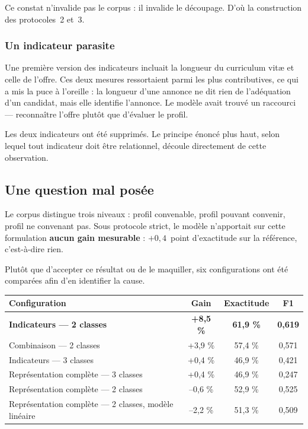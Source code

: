 \documentclass[11pt,a4paper]{article}
\begin{document}
Ce constat n'invalide pas le corpus : il invalide le découpage. D'où la construction des protocoles~2 et~3.

\subsubsection{Un indicateur parasite}
Une première version des indicateurs incluait la longueur du curriculum vitæ et celle de l'offre. Ces deux mesures ressortaient parmi les plus contributives, ce qui a mis la puce à l'oreille : la longueur d'une annonce ne dit rien de l'adéquation d'un candidat, mais elle identifie l'annonce. Le modèle avait trouvé un raccourci — reconnaître l'offre plutôt que d'évaluer le profil.

Les deux indicateurs ont été supprimés. Le principe énoncé plus haut, selon lequel tout indicateur doit être relationnel, découle directement de cette observation.

\subsection{Une question mal posée}
Le corpus distingue trois niveaux : profil convenable, profil pouvant convenir, profil ne convenant pas. Sous protocole strict, le modèle n'apportait sur cette formulation \textbf{aucun gain mesurable} : $+0{,}4$~point d'exactitude sur la référence, c'est-à-dire rien.

Plutôt que d'accepter ce résultat ou de le maquiller, six configurations ont été comparées afin d'en identifier la cause.

\begin{center}
\small
\begin{tabular}{lccc}
  \toprule
  \textbf{Configuration} & \textbf{Gain} & \textbf{Exactitude} & \textbf{F1} \\
  \midrule
  \textbf{Indicateurs --- 2 classes} & \textcolor{vert}{\textbf{+8,5 \%}} & \textbf{61,9 \%} & \textbf{0,619} \\
  Combinaison --- 2 classes & +3,9 \% & 57,4 \% & 0,571 \\
  Indicateurs --- 3 classes & +0,4 \% & 46,9 \% & 0,421 \\
  Représentation complète --- 3 classes & +0,4 \% & 46,9 \% & 0,247 \\
  Représentation complète --- 2 classes & \textcolor{gris}{--0,6 \%} & 52,9 \% & 0,525 \\
  Représentation complète --- 2 classes, modèle linéaire & \textcolor{gris}{--2,2 \%} & 51,3 \% & 0,509 \\
  \bottomrule
\end{tabular}
\end{center}
\end{document}
